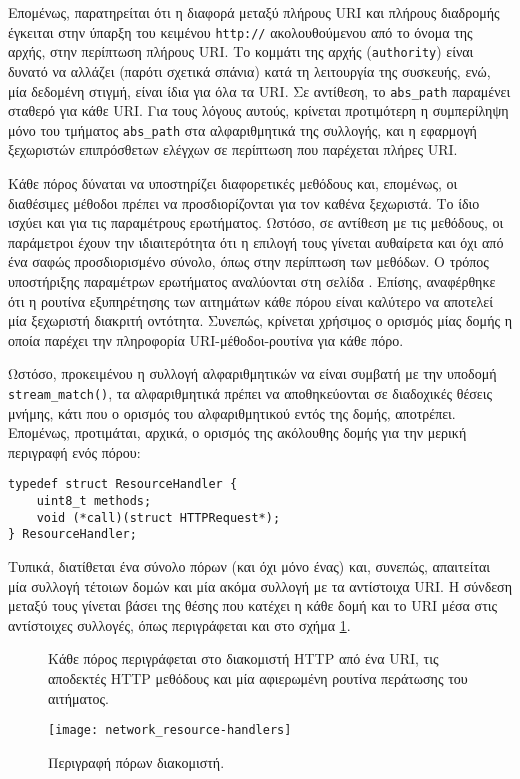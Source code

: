 Επομένως, παρατηρείται ότι η διαφορά μεταξύ πλήρους URI και πλήρους διαδρομής
έγκειται στην ύπαρξη του κειμένου \verb~http://~ ακολουθούμενου από το όνομα της
αρχής, στην περίπτωση πλήρους URI. Το κομμάτι της αρχής (\verb~authority~) είναι
δυνατό να αλλάζει (παρότι σχετικά σπάνια) κατά τη λειτουργία της συσκευής, ενώ,
μία δεδομένη στιγμή, είναι ίδια για όλα τα URI. Σε αντίθεση, το \verb~abs_path~
παραμένει σταθερό για κάθε URI. Για τους λόγους αυτούς, κρίνεται προτιμότερη η
συμπερίληψη μόνο του τμήματος \verb~abs_path~ στα αλφαριθμητικά της συλλογής,
και η εφαρμογή ξεχωριστών επιπρόσθετων ελέγχων σε περίπτωση που παρέχεται πλήρες
URI.

Κάθε πόρος δύναται να υποστηρίζει διαφορετικές μεθόδους και, επομένως, οι
διαθέσιμες μέθοδοι πρέπει να προσδιορίζονται για τον καθένα ξεχωριστά. Το ίδιο
ισχύει και για τις παραμέτρους ερωτήματος. Ωστόσο, σε αντίθεση με τις μεθόδους,
οι παράμετροι έχουν την ιδιαιτερότητα ότι η επιλογή τους γίνεται αυθαίρετα και
όχι από ένα σαφώς προσδιορισμένο σύνολο, όπως στην περίπτωση των μεθόδων. Ο
τρόπος υποστήριξης παραμέτρων ερωτήματος αναλύονται στη σελίδα
\pageref{ssubsec:network:query-string}.
Επίσης, αναφέρθηκε ότι η ρουτίνα εξυπηρέτησης των αιτημάτων κάθε πόρου είναι
καλύτερο να αποτελεί μία ξεχωριστή διακριτή οντότητα. Συνεπώς, κρίνεται χρήσιμος
ο ορισμός μίας δομής η οποία παρέχει την πληροφορία URI-μέθοδοι-ρουτίνα για κάθε
πόρο.

Ωστόσο, προκειμένου η συλλογή αλφαριθμητικών να είναι συμβατή με την υποδομή
\verb~stream_match()~, τα αλφαριθμητικά πρέπει να αποθηκεύονται σε διαδοχικές
θέσεις μνήμης, κάτι που ο ορισμός του αλφαριθμητικού εντός της δομής, αποτρέπει.
Επομένως, προτιμάται, αρχικά, ο ορισμός της ακόλουθης δομής για την μερική
περιγραφή ενός πόρου:
\begin{lstlisting}
typedef struct ResourceHandler {
    uint8_t methods;
    void (*call)(struct HTTPRequest*);
} ResourceHandler;
\end{lstlisting}
Τυπικά, διατίθεται ένα σύνολο πόρων (και όχι μόνο ένας) και, συνεπώς, απαιτείται
μία συλλογή τέτοιων δομών και μία ακόμα συλλογή με τα αντίστοιχα URI. Η σύνδεση
μεταξύ τους γίνεται βάσει της θέσης που κατέχει η κάθε δομή και το URI μέσα στις
αντίστοιχες συλλογές, όπως περιγράφεται και στο σχήμα
\ref{fig:network:resource-handlers}.

\begin{figure}
    \caption{Περιγραφή πόρων διακομιστή.
    \label{fig:network:resource-handlers}}
    Κάθε πόρος περιγράφεται στο διακομιστή HTTP από ένα URI, τις αποδεκτές HTTP
    μεθόδους και μία αφιερωμένη ρουτίνα περάτωσης του αιτήματος.
    \begin{center}
    \texttt{[image: network\_resource-handlers]}
    \end{center}
\end{figure}


